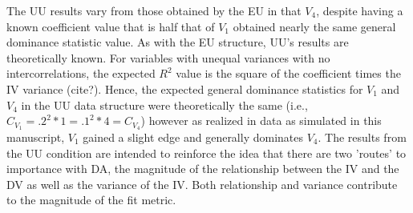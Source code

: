 \documentclass[ShortAfour,times,sageapa]{sagej}
\begin{document}
	
	The UU results vary from those obtained by the EU in that $V_4$, despite having a known coefficient value that is half that of $V_1$ obtained nearly the same general dominance statistic value.
	As with the EU structure, UU's results are theoretically known.
	For variables with unequal variances with no intercorrelations, the expected $R^2$ value is the square of the coefficient times the IV variance (cite?).
	Hence, the expected general dominance statistics for $V_1$ and $V_4$ in the UU data structure were theoretically the same (i.e., $C_{V_1} = .2^2*1 = .1^2*4 = C_{V_4}$) however as realized in data as simulated in this manuscript, $V_1$ gained a slight edge and generally dominates $V_4$.
	The results from the UU condition are intended to reinforce the idea that there are two 'routes' to importance with DA, the magnitude of the relationship between the IV and the DV as well as the variance of the IV.
	Both relationship and variance contribute to the magnitude of the fit metric.
	
	
\end{document}
